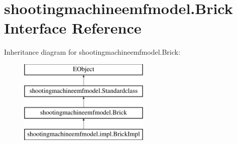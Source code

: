\hypertarget{interfaceshootingmachineemfmodel_1_1_brick}{\section{shootingmachineemfmodel.\-Brick Interface Reference}
\label{interfaceshootingmachineemfmodel_1_1_brick}
}
Inheritance diagram for shootingmachineemfmodel.\-Brick\-:\begin{figure}[H]
\begin{center}
\leavevmode
\includegraphics[height=4.000000cm]{interfaceshootingmachineemfmodel_1_1_brick}
\end{center}
\end{figure}
